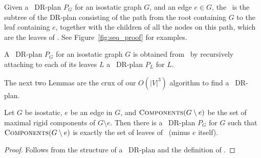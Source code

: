 \begin{definition}
[\Branch]
    Given a \pseudosequential\ DR-plan $P_G$ for an isostatic graph $G$, and an edge $e \in G$, the \branchGePG\ is the subtree of the DR-plan consisting of the path from the root containing $G$ to the leaf containing $e$, together with the children of all the nodes on this path, which are the leaves of \branchGePG. See Figure~\ref{fig:seq_proof} for examples.
\end{definition}

\begin{observation}
\label{obs:seqplan_rec_from_branches}
    A \pseudosequential\ DR-plan $P_G$ for an isostatic graph $G$ is obtained from \branchGePG\ by recursively attaching to each of its leaves $L$ a \pseudosequential\ DR-plan $P_L$ for $L$.
\end{observation}

The next two Lemmas are the crux of our $O(|V|^3)$ algorithm to find a \pseudosequential\ DR-plan.

\begin{lemma}
    Let $G$ be isostatic, $e$ be an edge in $G$, and $\textsc{Components}(G\setminus e)$ be the set of maximal rigid components of $G\setminus e$. Then there is a \pseudosequential\ DR-plan $P_G$ for $G$ such that $\textsc{Components}(G\setminus e)$ is exactly the set of leaves of \branchGePG\ (minus $e$ itself).
\end{lemma}

\begin{proof}
    Follows from the structure of a \pseudosequential\ DR-plan and the definition of \branchGePG.
\end{proof}



\ClearMyMinHeight
{}

